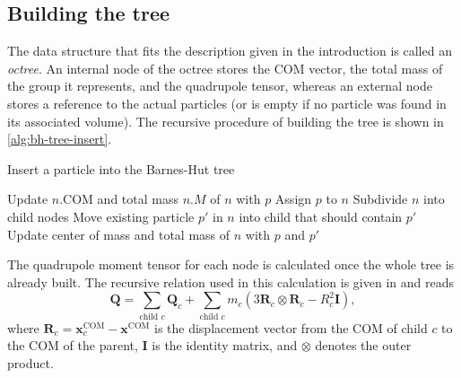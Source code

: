 \subsection{Building the tree}
The data structure that fits the description given in the introduction is called an \textit{octree}.
An internal node of the octree stores the COM vector, the total mass of the group it represents, and the quadrupole tensor, whereas an external node stores a reference to the actual particles (or is empty if no particle was found in its associated volume).
The recursive procedure of building the tree is shown in \autoref{alg:bh-tree-insert}.
\begin{algorithm}
    \caption{Insert a particle into the Barnes-Hut tree}\label{alg:bh-tree-insert}
    \begin{algorithmic}[1]
        \State Update $n.\textrm{COM}$ and total mass $n.M$ of $n$ with $p$
        \State {}
        \State Assign $p$ to $n$
        \Else {}
        \State Subdivide $n$ into child nodes
        \State Move existing particle $p'$ in $n$ into child that should contain $p'$
        \State Update center of mass and total mass of $n$ with $p$ and $p'$
        \State {}
        \EndIf
        \EndFunction
    \end{algorithmic}
\end{algorithm}
The quadrupole moment tensor for each node is calculated once the whole tree is already built.
The recursive relation used in this calculation is given in \cite{hernquist1987performance} and reads
\begin{equation*}
    \mathbf{Q} = \sum_{\text{child }c} \mathbf{Q}_c + \sum_{\text{child }c} m_c(3 \mathbf{R}_c \otimes \mathbf{R}_c - R_c^2 \mathbf{I}),
\end{equation*}
where $\mathbf{R}_c = \mathbf{x}^\text{COM}_c - \mathbf{x}^\text{COM}$ is the displacement vector from the COM of child $c$ to the COM of the parent, $\mathbf{I}$ is the identity matrix, and $\otimes$ denotes the outer product.

